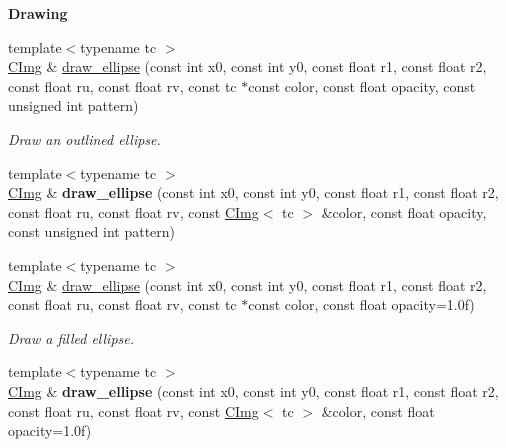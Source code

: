 \begin{Indent}{\bf Drawing}
\begin{DoxyCompactItemize}
\item 
{\footnotesize template$<$typename tc $>$ }\\\hyperlink{structcimg__library_1_1_c_img}{C\-Img} \& \hyperlink{structcimg__library_1_1_c_img_aba2d6203e2f75b854edfee0376f9f561}{draw\-\_\-ellipse} (const int x0, const int y0, const float r1, const float r2, const float ru, const float rv, const tc $\ast$const color, const float opacity, const unsigned int pattern)
\begin{DoxyCompactList}\small\item\em Draw an outlined ellipse. \end{DoxyCompactList}\item 
\hypertarget{structcimg__library_1_1_c_img_a00176f69a3249c3dea16cff9c79e5382}{{\footnotesize template$<$typename tc $>$ }\\\hyperlink{structcimg__library_1_1_c_img}{C\-Img} \& {\bfseries draw\-\_\-ellipse} (const int x0, const int y0, const float r1, const float r2, const float ru, const float rv, const \hyperlink{structcimg__library_1_1_c_img}{C\-Img}$<$ tc $>$ \&color, const float opacity, const unsigned int pattern)}\label{structcimg__library_1_1_c_img_a00176f69a3249c3dea16cff9c79e5382}

\item 
{\footnotesize template$<$typename tc $>$ }\\\hyperlink{structcimg__library_1_1_c_img}{C\-Img} \& \hyperlink{structcimg__library_1_1_c_img_ab8da51455c8de6d89ac8bec9f63eb410}{draw\-\_\-ellipse} (const int x0, const int y0, const float r1, const float r2, const float ru, const float rv, const tc $\ast$const color, const float opacity=1.\-0f)
\begin{DoxyCompactList}\small\item\em Draw a filled ellipse. \end{DoxyCompactList}\item 
\hypertarget{structcimg__library_1_1_c_img_a0cc190ee9d9eae984c78747b22c83323}{{\footnotesize template$<$typename tc $>$ }\\\hyperlink{structcimg__library_1_1_c_img}{C\-Img} \& {\bfseries draw\-\_\-ellipse} (const int x0, const int y0, const float r1, const float r2, const float ru, const float rv, const \hyperlink{structcimg__library_1_1_c_img}{C\-Img}$<$ tc $>$ \&color, const float opacity=1.\-0f)}\label{structcimg__library_1_1_c_img_a0cc190ee9d9eae984c78747b22c83323}


\end{DoxyCompactItemize}
\end{Indent}
